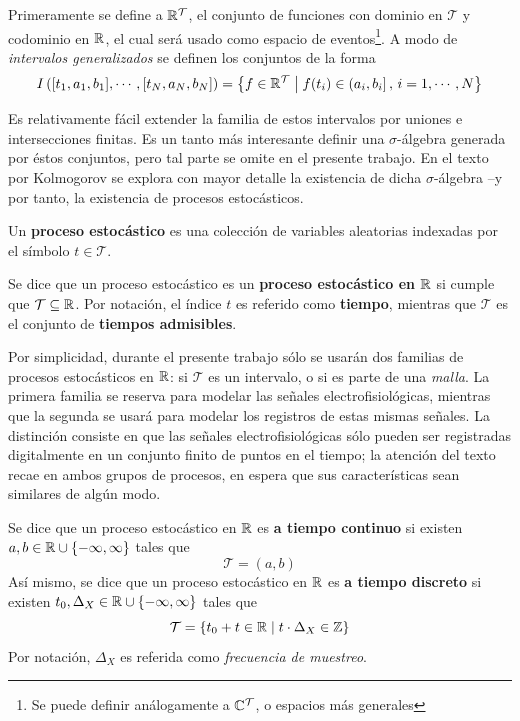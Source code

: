 Primeramente se define a $\mathbb{R}^{\mathcal{T}}$, el conjunto de funciones con dominio en $\mathcal{T}$ y codominio en $\mathbb{R}$, el cual será usado como espacio de eventos\footnote{Se puede definir análogamente a $\mathbb{C}^{\mathcal{T}}$, o espacios más generales}. 
%
A modo de \textit{intervalos generalizados} se definen los conjuntos de la forma
\begin{equation}
I\left( [t_1, a_1, b_1], \cdots, [t_N, a_N, b_N] \right) = 
\left\{ f \in \mathbb{R}^{\mathcal{T}} \mathrel{}\middle|\mathrel{} f(t_i) \in (a_i, b_i] \, , \, i = 1, \cdots, N \right\}
\end{equation}

Es relativamente fácil extender la familia de estos intervalos por uniones e intersecciones finitas. Es un tanto más interesante definir una $\sigma$-álgebra generada por éstos conjuntos, pero tal parte se omite en el presente trabajo.
%
En el texto por Kolmogorov se explora con mayor detalle la existencia de dicha $\sigma$-álgebra --y por tanto, la existencia de procesos estocásticos.

\begin{definicion}
Un \textbf{proceso estocástico} \xt es una colección de variables aleatorias indexadas por el símbolo $t\in\mathcal{T}$.
\end{definicion}

\begin{definicion}
Se dice que un proceso estocástico \xt es un \textbf{proceso estocástico en $\mathbb{R}$} si cumple que $\mathcal{T} \subseteq \mathbb{R}$.
%
Por notación, el índice $t$ es referido como \textbf{tiempo}, mientras que $\mathcal{T}$ es el conjunto de \textbf{tiempos admisibles}.
\end{definicion}

Por simplicidad, durante el presente trabajo sólo se usarán dos familias de procesos estocásticos en $\mathbb{R}$: si $\mathcal{T}$ es un intervalo, o si es parte de una \textit{malla}. 
%
La primera familia se reserva para modelar las señales electrofisiológicas, mientras que la segunda se usará para modelar los registros de estas mismas señales.
%
La distinción consiste en que las señales electrofisiológicas sólo pueden ser registradas digitalmente en un conjunto finito de puntos en el tiempo; la atención del texto recae en ambos grupos de procesos, en espera que sus características sean similares de algún modo.

\begin{definicion}
Se dice que un proceso estocástico en $\mathbb{R}$ es \textbf{a tiempo continuo} si existen $a, b \in \mathbb{R} \cup \{ -\infty, \infty \}$ tales que
\begin{equation}
\mathcal{T} = (a,b)
\end{equation}
Así mismo, se dice que un proceso estocástico en $\mathbb{R}$ es \textbf{a tiempo discreto} si existen $t_0, \Delta_X \in \mathbb{R} \cup \{ -\infty, \infty \}$ tales que
\begin{equation}
\mathcal{T} = \left\{ t_0 + t \in \mathbb{R} \mathrel{}\middle|\mathrel{} {t} \cdot {\Delta_X} \in \mathbb{Z} \right\}
\end{equation}
Por notación, $\Delta_X$ es referida como \textit{frecuencia de muestreo}.
\end{definicion}


